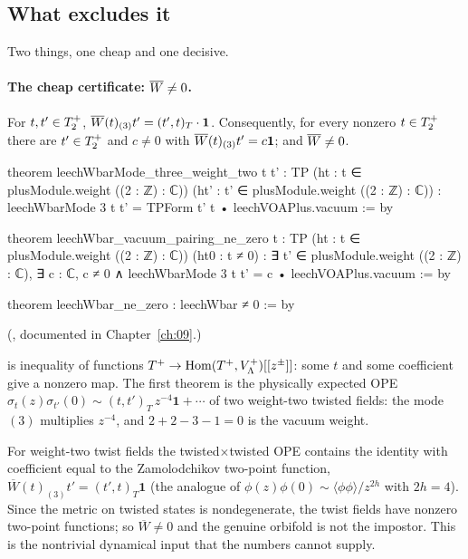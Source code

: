 \subsection{What excludes it}

Two things, one cheap and one decisive.

\paragraph{The cheap certificate: $\overline{W}\ne0$.}
\begin{theorem}\label{ch10:thm:wbarne}
For $t,t'\in T^{+}_2$, $\overline{W}(t)_{(3)}t'=(t',t)_T\cdot\mathbf1$.  Consequently, for every nonzero
$t\in T^{+}_2$ there are $t'\in T^{+}_2$ and $c\ne0$ with $\overline{W}(t)_{(3)}t'=c\mathbf 1$; and
$\overline{W}\neq0$.
\end{theorem}
\begin{leancode}
theorem leechWbarMode_three_weight_two {t t' : TP} (ht : t ∈ plusModule.weight ((2 : ℤ) : ℂ))
    (ht' : t' ∈ plusModule.weight ((2 : ℤ) : ℂ)) :
    leechWbarMode 3 t t' = TPForm t' t • leechVOAPlus.vacuum := by

theorem leechWbar_vacuum_pairing_ne_zero {t : TP} (ht : t ∈ plusModule.weight ((2 : ℤ) : ℂ))
    (ht0 : t ≠ 0) :
    ∃ t' ∈ plusModule.weight ((2 : ℤ) : ℂ), ∃ c : ℂ, c ≠ 0 ∧
      leechWbarMode 3 t t' = c • leechVOAPlus.vacuum := by

theorem leechWbar_ne_zero : leechWbar ≠ 0 := by
\end{leancode}
(, documented in Chapter~\ref{ch:09}.)
\begin{dictionary}
 is inequality of functions $T^{+}\to\operatorname{Hom}(T^{+},V_{\Lambda}^{+})[[z^\pm]]$:
some $t$ and some coefficient give a nonzero map.  The first theorem is the physically expected
OPE $\sigma_t(z)\sigma_{t'}(0)\sim(t,t')_T\,z^{-4}\mathbf 1+\cdots$ of two weight-two twisted fields:
the mode $(3)$ multiplies $z^{-4}$, and $2+2-3-1=0$ is the vacuum weight.
\end{dictionary}

\begin{physics}
For weight-two twist fields the twisted$\times$twisted OPE contains the identity with coefficient equal to the Zamolodchikov two-point function, $\overline W(t)_{(3)}t'=(t',t)_T\mathbf1$ (the analogue of $\phi(z)\phi(0)\sim\langle\phi\phi\rangle/z^{2h}$ with $2h=4$). Since the metric on twisted states is nondegenerate, the twist fields have nonzero two-point functions; so $\overline W\neq0$ and the genuine orbifold is not the impostor. This is the nontrivial dynamical input that the numbers cannot supply.
\end{physics}

